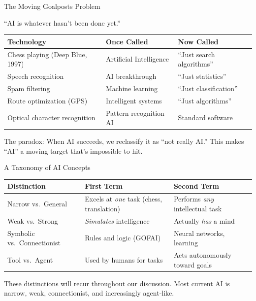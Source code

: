 \documentclass[aspectratio=169,11pt]{beamer}
\begin{document}
\begin{frame}{The Moving Goalposts Problem}
\begin{quotebox}
``AI is whatever hasn't been done yet.''
\end{quotebox}

\vspace{0.2em}
\begin{table}[h]
\centering
\scriptsize
\begin{tabular}{@{}lll@{}}
\toprule
\textbf{Technology} & \textbf{Once Called} & \textbf{Now Called} \\
\midrule
Chess playing (Deep Blue, 1997) & Artificial Intelligence & ``Just search algorithms'' \\
Speech recognition & AI breakthrough & ``Just statistics'' \\
Spam filtering & Machine learning & ``Just classification'' \\
Route optimization (GPS) & Intelligent systems & ``Just algorithms'' \\
Optical character recognition & Pattern recognition AI & Standard software \\
\bottomrule
\end{tabular}
\end{table}

\vspace{0.2em}
The paradox: When AI succeeds, we reclassify it as ``not really AI.'' This makes ``AI'' a moving target that's impossible to hit.
\end{frame}

\begin{frame}{A Taxonomy of AI Concepts}
\begin{table}[h]
\centering
\small
\begin{tabular}{@{}p{3cm}p{5cm}p{5cm}@{}}
\toprule
\textbf{Distinction} & \textbf{First Term} & \textbf{Second Term} \\
\midrule
Narrow vs.\ General & Excels at \emph{one} task (chess, translation) & Performs \emph{any} intellectual task \\
\addlinespace
Weak vs.\ Strong & \emph{Simulates} intelligence & Actually \emph{has} a mind \\
\addlinespace
Symbolic vs.\ Connectionist & Rules and logic (GOFAI) & Neural networks, learning \\
\addlinespace
Tool vs.\ Agent & Used by humans for tasks & Acts autonomously toward goals \\
\bottomrule
\end{tabular}
\end{table}

\vspace{0.2em}
These distinctions will recur throughout our discussion. Most current AI is narrow, weak, connectionist, and increasingly agent-like.
\end{frame}
\end{document}
